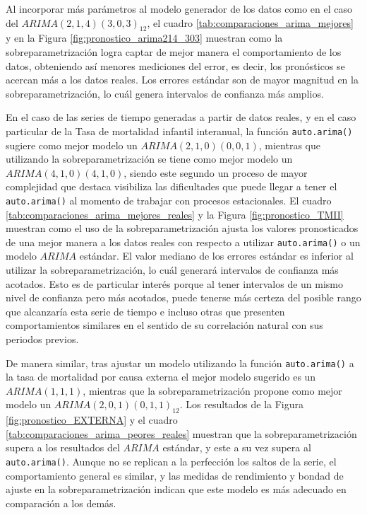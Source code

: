 \documentclass[
]{article}
\begin{document}
Al incorporar más parámetros al modelo generador de los datos como en el
caso del \(ARIMA(2,1,4)(3,0,3)_{12}\), el cuadro
\ref{tab:comparaciones_arima_mejores} y en la Figura
\ref{fig:pronostico_arima214_303} muestran como la sobreparametrización
logra captar de mejor manera el comportamiento de los datos, obteniendo
así menores mediciones del error, es decir, los pronósticos se acercan
más a los datos reales. Los errores estándar son de mayor magnitud en la
sobreparametrización, lo cuál genera intervalos de confianza más
amplios.

En el caso de las series de tiempo generadas a partir de datos reales, y
en el caso particular de la Tasa de mortalidad infantil interanual, la
función \texttt{auto.arima()} sugiere como mejor modelo un
\(ARIMA(2,1,0)(0,0,1)\), mientras que utilizando la sobreparametrización
se tiene como mejor modelo un \(ARIMA(4,1,0)(4,1,0)\), siendo este
segundo un proceso de mayor complejidad que destaca visibiliza las
dificultades que puede llegar a tener el \texttt{auto.arima()} al
momento de trabajar con procesos estacionales. El cuadro
\ref{tab:comparaciones_arima_mejores_reales} y la Figura
\ref{fig:pronostico_TMII} muestran como el uso de la
sobreparametrización ajusta los valores pronosticados de una mejor
manera a los datos reales con respecto a utilizar \texttt{auto.arima()}
o un modelo \(ARIMA\) estándar. El valor mediano de los errores estándar
es inferior al utilizar la sobreparametrización, lo cuál generará
intervalos de confianza más acotados. Esto es de particular interés
porque al tener intervalos de un mismo nivel de confianza pero más
acotados, puede tenerse más certeza del posible rango que alcanzaría
esta serie de tiempo e incluso otras que presenten comportamientos
similares en el sentido de su correlación natural con sus periodos
previos.

De manera similar, tras ajustar un modelo utilizando la función
\texttt{auto.arima()} a la tasa de mortalidad por causa externa el mejor
modelo sugerido es un \(ARIMA(1,1,1)\), mientras que la
sobreparametrización propone como mejor modelo un
\(ARIMA(2,0,1)(0,1,1)_{12}\). Los resultados de la Figura
\ref{fig:pronostico_EXTERNA} y el cuadro
\ref{tab:comparaciones_arima_peores_reales} muestran que la
sobreparametrización supera a los resultados del \(ARIMA\) estándar, y
este a su vez supera al \texttt{auto.arima()}. Aunque no se replican a
la perfección los saltos de la serie, el comportamiento general es
similar, y las medidas de rendimiento y bondad de ajuste en la
sobreparametrización indican que este modelo es más adecuado en
comparación a los demás.
\end{document}
